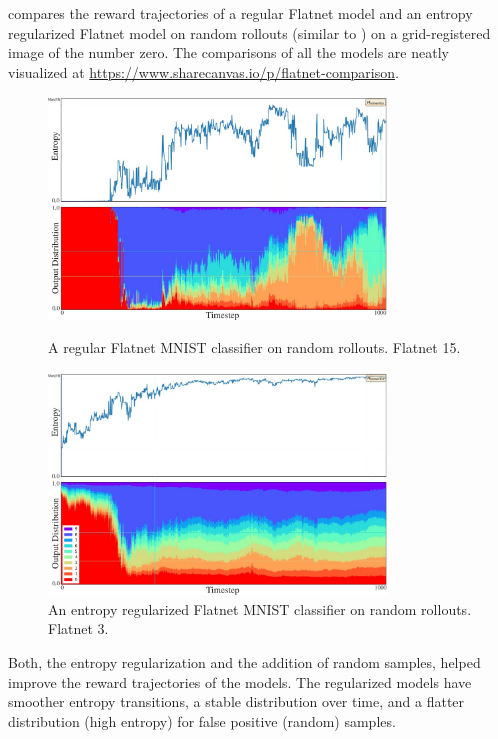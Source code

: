  compares the reward trajectories of a regular Flatnet model and an entropy regularized Flatnet model on random rollouts (similar to ) on a grid-registered image of the number zero.
The comparisons of all the models are neatly visualized at \url{https://www.sharecanvas.io/p/flatnet-comparison}.

\begin{figure}[H]
    \centering
    \includegraphics[width=0.8\textwidth]{images/Flatnet 15.pdf}
    \caption[A regular Flatnet MNIST classifier on random rollouts.]{A regular Flatnet MNIST classifier on random rollouts. Flatnet 15.}
    \vspace{12pt}
    \includegraphics[width=0.8\textwidth]{images/Flatnet 3.pdf}
    \caption[An entropy regularized Flatnet MNIST classifier on random rollouts.]{An entropy regularized Flatnet MNIST classifier on random rollouts. Flatnet 3.}
    \label{fig:flatnet-comparison}
\end{figure}

Both, the entropy regularization and the addition of random samples, helped improve the reward trajectories of the models.
The regularized models have smoother entropy transitions, a stable distribution over time, and a flatter distribution (high entropy) for false positive (random) samples.


